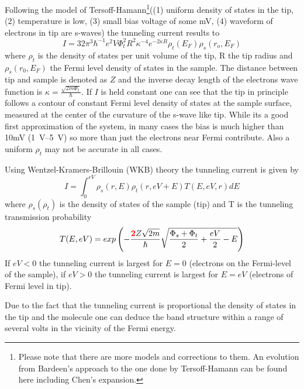 Following the model of  Tersoff-Hamann\footnote{Please note that there are more models and corrections to them. An evolution from Bardeen's approach to the one done by Tersoff-Hamann can be found here \cite{lounis_theory_2014, wortmann_interpretation_2000} including Chen’s expansion.}((1) uniform density of states in the tip, (2) temperature is low, (3) small bias voltage of some mV, (4) waveform of electrons in tip are s-waves) the tunneling current results to 
$$I=32\pi^3\hbar^{-1}e^2V\Phi_t^2 R^2\kappa^{-4}e^{-2\kappa R}\rho_t(E_F)\rho_s(r_o,E_F)$$ where $\rho_t$ is the density of states per unit volume of the tip, R the tip radius and $\rho_s(r_0,E_F)$ the Fermi level density of states in the sample\cite{bonnell_scanning_1993}. The distance between tip and sample is denoted as $Z$ and the inverse decay length of the electrons wave function is $\kappa=\frac{\sqrt{2m\Phi_t}}{\hbar}$. If $I$ is held constant one can see that the tip in principle follows a contour of constant Fermi level density of states at the sample surface, measured at the center of the curvature of the s-wave like tip. While its a good first approximation of the system, in many cases the bias is much higher than 10mV (\SIrange{1}{5}{\V}) so more than just the electrons near Fermi contribute. Also a uniform $\rho_t$ may not be accurate in all cases.

Using  Wentzel-Kramers-Brillouin (WKB) theory\cite{wentzel_verallgemeinerung_1926, kramers_wellenmechanik_1926, brillouin_mecanique_1926} the tunneling current is given by
\begin{equation}
I=\int_0^{eV}\rho_s(r,E)\rho_t(r,eV+E)T(E,eV,r)dE
\label{WKB}
\end{equation}
where $\rho_s(\rho_t)$ is the density of states of the sample (tip) and T is the tunneling transmission probability
\begin{equation}
T(E,eV)=exp\left(-\frac{\textcolor{red}{\textbf{2}}Z\sqrt{2m}}{\hbar}\sqrt{\frac{\Phi_s+\Phi_t}{2}+\frac{eV}{2}-E}\right)
\label{Transmission-function} 
\end{equation}
If $eV<0$ the tunneling current is largest for $E=0$ (electrons on the Fermi-level of the sample), if $eV>0$ the tunneling current is largest for $E=eV$ (electrons of Fermi level in tip).

Due to the fact that the tunneling current is proportional the density of states in the tip and the molecule one can deduce the band structure within a range of several volts in the vicinity of the Fermi energy.

